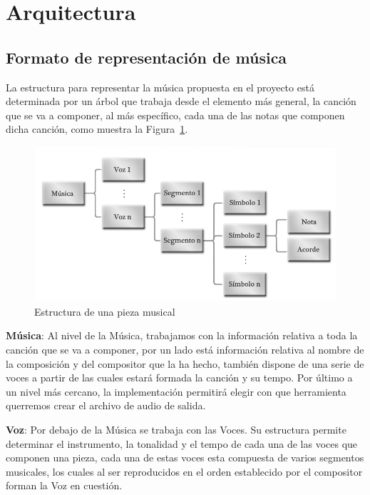 \section{Arquitectura}

\subsection{Formato de representación de música}


La estructura para representar la música propuesta en el proyecto está determinada por un árbol que trabaja desde el elemento más general, la canción que se va a componer, al más específico, cada una de las notas que componen dicha canción, como muestra la Figura~\ref{fig:structmusic}.\\
	
	\begin{figure}[htbp]
	\centering
	\hspace*{-0.1in}
	\includegraphics[scale=0.47]{graphics/musica-estructura.png}
	\caption{Estructura de una pieza musical}
	\label{fig:structmusic}
	\end{figure}


\textbf{Música}: Al nivel de la Música, trabajamos con la información relativa a toda la canción que se va a componer, por un lado está información relativa al nombre de la composición y del compositor que la ha hecho, también dispone de una serie de voces a partir de las cuales estará formada la canción y su tempo. Por último a un nivel más cercano, la implementación permitirá elegir con que herramienta querremos crear el archivo de audio de salida.
\newline

\textbf{Voz}: Por debajo de la Música se trabaja con las Voces. Su estructura permite determinar el instrumento, la tonalidad y el tempo de cada una de las voces que componen una pieza, cada una de estas voces esta compuesta de varios segmentos musicales, los cuales al ser reproducidos en el orden establecido por el compositor forman la Voz en cuestión.
\newline


